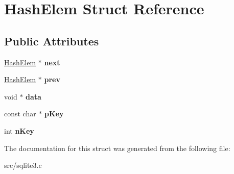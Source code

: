 \hypertarget{struct_hash_elem}{\section{Hash\-Elem Struct Reference}
\label{struct_hash_elem}
}
\subsection*{Public Attributes}
\begin{DoxyCompactItemize}
\item 
\hypertarget{struct_hash_elem_a2d28fad45ff21ffb8a02a7133df860fd}{\hyperlink{struct_hash_elem}{Hash\-Elem} $\ast$ {\bfseries next}}\label{struct_hash_elem_a2d28fad45ff21ffb8a02a7133df860fd}

\item 
\hypertarget{struct_hash_elem_ae4d011c0dc807a3c100ccdb927dd0ba9}{\hyperlink{struct_hash_elem}{Hash\-Elem} $\ast$ {\bfseries prev}}\label{struct_hash_elem_ae4d011c0dc807a3c100ccdb927dd0ba9}

\item 
\hypertarget{struct_hash_elem_ac7e80f63ba2f82457ff68aa0cd360365}{void $\ast$ {\bfseries data}}\label{struct_hash_elem_ac7e80f63ba2f82457ff68aa0cd360365}

\item 
\hypertarget{struct_hash_elem_a9c33a7c8ac467a5547a123338daf61f4}{const char $\ast$ {\bfseries p\-Key}}\label{struct_hash_elem_a9c33a7c8ac467a5547a123338daf61f4}

\item 
\hypertarget{struct_hash_elem_a12c1252e6aa2958f73e2ef969c9a3d81}{int {\bfseries n\-Key}}\label{struct_hash_elem_a12c1252e6aa2958f73e2ef969c9a3d81}

\end{DoxyCompactItemize}


The documentation for this struct was generated from the following file\-:\begin{DoxyCompactItemize}
\item 
src/sqlite3.\-c\end{DoxyCompactItemize}
